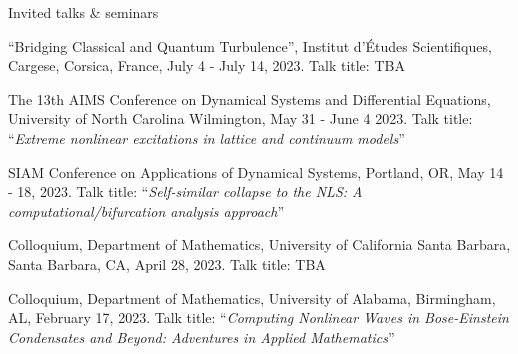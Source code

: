 \documentclass[10pt]{article} %
\newenvironment{benumerate}[1]{
    \let\oldItem\item
    \def\item{\addtocounter{enumi}{-2}\oldItem}
    \begin{enumerate}
    \setcounter{enumi}{#1}
    \addtocounter{enumi}{1}
}{
    \end{enumerate}
}
\begin{document}

\begin{section}{Invited talks \& seminars}
\begin{etaremune}
\setlength\itemsep{1em}
\item \vskip -6.5mm ``Bridging Classical and Quantum Turbulence'',
Institut d'\'Etudes Scientifiques, Cargese, Corsica, France, July 4 - July 14, 2023.
Talk title: TBA


\item The 13th AIMS Conference on Dynamical Systems and Differential Equations, University of North Carolina Wilmington, %
May 31 - June 4 2023. Talk title: ``\textit{Extreme nonlinear excitations in lattice and continuum models}''

\item SIAM Conference on Applications of Dynamical Systems, Portland, OR, May 14 - 18, 2023. 
Talk title: ``\textit{Self-similar collapse to the NLS: A computational/bifurcation analysis approach}''

\item Colloquium, Department of Mathematics, University of California Santa Barbara, Santa Barbara, CA, April 28, 2023.
Talk title: TBA

\item Colloquium, Department of Mathematics, University of Alabama, Birmingham, AL, February 17, 2023. 
Talk title: ``\textit{Computing Nonlinear Waves in Bose-Einstein Condensates and Beyond: Adventures in 
Applied Mathematics}''


\end{etaremune}
\end{section}
\end{document}
